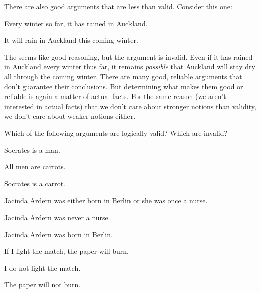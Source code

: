 \documentclass[PHIL101-Textbook.tex]{subfiles}
\begin{document}
There are also good arguments that are less than valid.  Consider this one:
	\begin{earg}
		\item[] Every winter so far, it has rained in Auckland.
	\item[\therefore] It will rain in Auckland this coming winter.
\end{earg}
The seems like good reasoning, but the argument is invalid. Even if it has rained in Auckland every winter thus far, it remains \emph{possible} that Auckland will stay dry all through the coming winter. There are many good, reliable arguments that don't guarantee their conclusions. But determining what makes them good or reliable is again a matter of actual facts. For the same reason (we  aren't interested in actual facts) that we don't care about stronger notions than validity, we don't care about weaker notions either.


\pagebreak
\practiceproblems
\problempart
Which of the following arguments are logically valid? Which are invalid?

\begin{earg}
\item Socrates is a man.
\item All men are carrots.
\item[\therefore] Socrates is a carrot.
\end{earg}

\begin{earg}
\item Jacinda Ardern was either born in Berlin or she was once a nurse.
\item Jacinda Ardern was never a nurse.
\item[\therefore] Jacinda Ardern was born in Berlin.
\end{earg}

\begin{earg}
\item If I light the match, the paper will burn.
\item I do not light the match.
\item[\therefore] The paper will not burn.
\end{earg}
\end{document}
